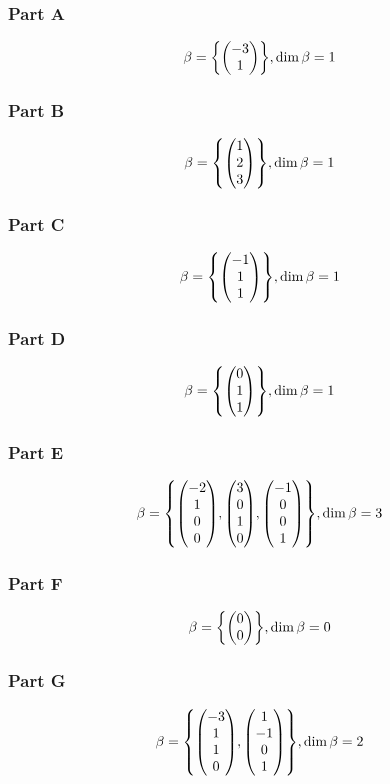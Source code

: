 \documentclass[12pt,titlepage]{extarticle}
\begin{document}
\begin{multicols}{2}
\subsubsection*{Part A}
\[
    \beta = \qty{\mqty(-3 \\ 1)}, \dim \beta = 1
\]

\subsubsection*{Part B}
\[
    \beta = \qty{
        \mqty(1 \\ 2 \\ 3)
    },
    \dim \beta = 1
\]

\subsubsection*{Part C}
\[
    \beta = \qty{
        \mqty(-1 \\ 1 \\ 1)
    },
    \dim \beta = 1
\]

\subsubsection*{Part D}
\[
    \beta = \qty{
        \mqty(0 \\ 1 \\ 1)
    },
    \dim \beta = 1
\]

\subsubsection*{Part E}
\[
    \beta = \qty{
        \mqty(-2 \\ 1 \\ 0 \\ 0),
        \mqty(3 \\ 0 \\ 1 \\ 0),
        \mqty(-1 \\ 0 \\ 0 \\ 1)
    },
    \dim \beta = 3
\]

\subsubsection*{Part F}
\[
    \beta = \qty{
        \mqty(0 \\ 0)
    },
    \dim \beta = 0
\]

\subsubsection*{Part G}
\[
    \beta = \qty{
        \mqty(-3 \\ 1 \\ 1 \\ 0),
        \mqty(1 \\ -1 \\ 0 \\ 1)
    },
    \dim \beta = 2
\]
\end{multicols}
\end{document}
